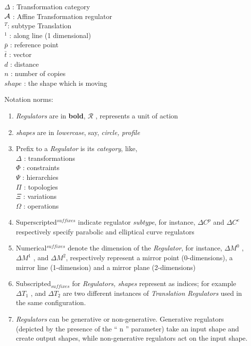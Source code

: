 		 $\Delta$ : Transformation category\\
	     	 ${\bf \mathcal{A}}$ : Affine Transformation regulator\\
		 $^T$: subtype Translation \\
		 $^1$ : along line (1 dimensional)\\
	         $\bar{p}$ : reference point\\
  		 $\bar{t}$ : vector\\
		 $d$ : distance\\
		 $n$ : number of copies\\
		 $shape$ : the shape which is moving

Notation norms:
\begin{enumerate}

	\item {\em Regulators} are in {\bf bold}, {\bf  $\mathcal{R}$} , represents a unit of action
	\item {\em shapes} are in {\em lowercase}, say, {\em circle, profile}
	\item Prefix to a  {\em Regulator} is its {\em category}, like, \\
		 $\Delta$	 :  transformations  \\
		 $\Phi$		 :  constraints  \\
		 $\Psi$		 :  hierarchies  \\
		 $\Pi$		 :  topologies  \\
		 $\Xi$		 : variations  \\
		 $\Omega$	:  operations

	\item Superscripted$^{suffixes}$  indicate  regulator  {\em subtype},  for instance, $\Delta C^p$ and  $\Delta C^e$  respectively specify parabolic and elliptical curve regulators

	\item Numerical$^{suffixes}$ denote the dimension of the {\em Regulator}, for instance, $\Delta M^0$ ,   $\Delta M^1$ , and   $\Delta M^2$, respectively represent a mirror point (0-dimensions), a mirror line (1-dimension) and a mirror plane (2-dimensions)

	\item  Subscripted$_{suffixes}$ for {\em Regulators,  shapes} represent  as  indices;  for  example  $\Delta T_1$ ,  and  $\Delta T_2$  are  two different instances of {\em Translation Regulators} used in the same configuration.

	\item {\em Regulators} can be generative or non-generative.  Generative  regulators (depicted by the presence of the “ n ” parameter)  take  an  input  shape  and  create output  shapes,  while  non-generative  regulators  act  on  the  input  shape.


\end{enumerate}
